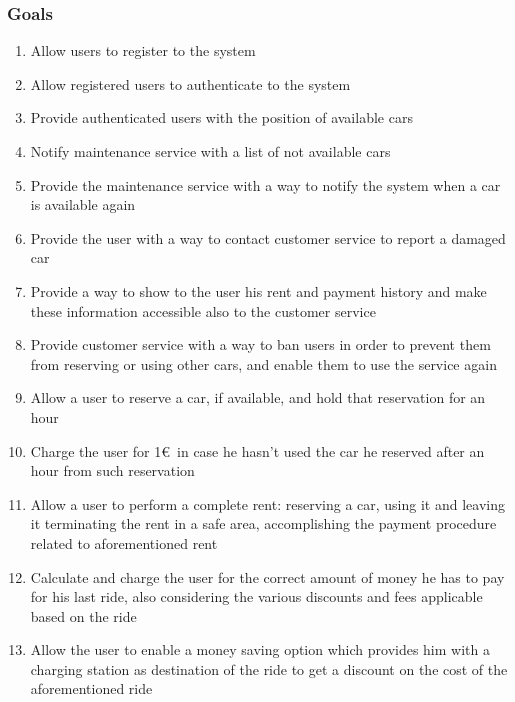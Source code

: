 	\subsubsection{Goals}
	\begin{enumerate}[label=\textbf{G\arabic*}]
		\item \label{goal:register} Allow users to register to the system
		\item \label{goal:login}Allow registered users to authenticate to the system
		\item \label{goal:position}Provide authenticated users with the position of available cars
		\item \label{goal:notifyMaintenance} Notify maintenance service with a list of not available cars 
		\item \label{goal:maintenanceDone} Provide the maintenance service with a way to notify the system when a car is available again 
		\item \label{goal:needMaintenance} Provide the user with a way to contact customer service to report a damaged car
		\item \label{goal:usersHistory} Provide a way to show to the user his rent and payment history and make these information accessible also to the customer service
		\item \label{goal:banUnbanUsers}Provide customer service with a way to ban users in order to prevent them from reserving or using other cars, and enable them to use the service again
		\item \label{goal:carReservation} Allow a user to reserve a car, if available, and hold that reservation for an hour
		\item \label{goal:reservationFee}Charge the user for 1\euro\ in case he hasn't used the car he reserved after an hour from such reservation
		\item \label{goal:completeRent}Allow a user to perform a complete rent: reserving a car, using it and leaving it terminating the rent in a safe area, accomplishing the payment procedure related to aforementioned rent
		\item \label{goal:calculateCost}Calculate and charge the user for the correct amount of money he has to pay for his last ride, also considering the various discounts and fees applicable based on the ride
		\item \label{goal:moneySavingOption}Allow the user to enable a money saving option which provides him with a charging station as destination of the ride to get a discount on the cost of the aforementioned ride
	\end{enumerate}

